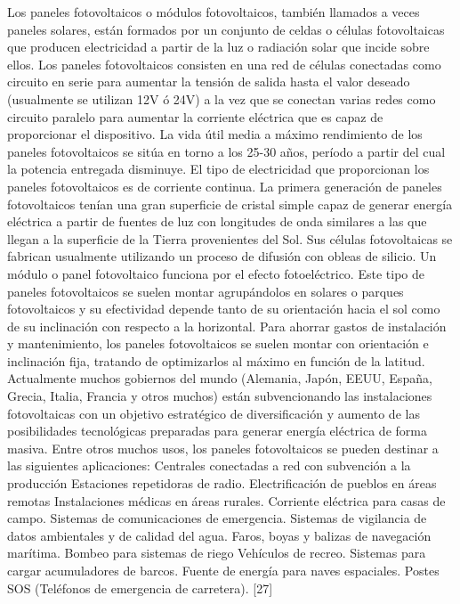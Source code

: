 \documentclass[12pt]{article}
\begin{document}
Los paneles fotovoltaicos o módulos fotovoltaicos, también llamados a veces paneles solares, están formados por un conjunto de celdas o células fotovoltaicas que producen electricidad a partir de la luz o radiación solar que incide sobre ellos.
Los paneles fotovoltaicos consisten en una red de células conectadas como circuito en serie para aumentar la tensión de salida hasta el valor deseado (usualmente se utilizan 12V ó 24V) a la vez que se conectan varias redes como circuito paralelo para aumentar la corriente eléctrica que es capaz de proporcionar el dispositivo. La vida útil media a máximo rendimiento de los paneles fotovoltaicos se sitúa en torno a los 25-30 años, período a partir del cual la potencia entregada disminuye.
El tipo de electricidad que proporcionan los paneles fotovoltaicos es de corriente continua.
La primera generación de paneles fotovoltaicos tenían una gran superficie de cristal simple capaz de generar energía eléctrica a partir de fuentes de luz con longitudes de onda similares a las que llegan a la superficie de la Tierra provenientes del Sol. Sus células fotovoltaicas se fabrican usualmente utilizando un proceso de difusión con obleas de silicio.
Un módulo o panel fotovoltaico funciona por el efecto fotoeléctrico. Este tipo de paneles fotovoltaicos se suelen montar agrupándolos en solares o parques fotovoltaicos y su efectividad depende tanto de su orientación hacia el sol como de su inclinación con respecto a la horizontal. Para ahorrar gastos de instalación y mantenimiento, los paneles fotovoltaicos se suelen montar con orientación e inclinación fija, tratando de optimizarlos al máximo en función de la latitud.
Actualmente muchos gobiernos del mundo (Alemania, Japón, EEUU, España, Grecia, Italia, Francia y otros muchos) están subvencionando las instalaciones fotovoltaicas con un objetivo estratégico de diversificación y aumento de las posibilidades tecnológicas preparadas para generar energía eléctrica de forma masiva.
Entre otros muchos usos, los paneles fotovoltaicos se pueden destinar a las siguientes aplicaciones:
Centrales conectadas a red con subvención a la producción
Estaciones repetidoras de radio.
Electrificación de pueblos en áreas remotas
Instalaciones médicas en áreas rurales.
Corriente eléctrica para casas de campo.
Sistemas de comunicaciones de emergencia.
Sistemas de vigilancia de datos ambientales y de calidad del agua.
Faros, boyas y balizas de navegación marítima.
Bombeo para sistemas de riego
Vehículos de recreo.
Sistemas para cargar acumuladores de barcos.
Fuente de energía para naves espaciales.
Postes SOS (Teléfonos de emergencia de carretera). [27]
\end{document}
